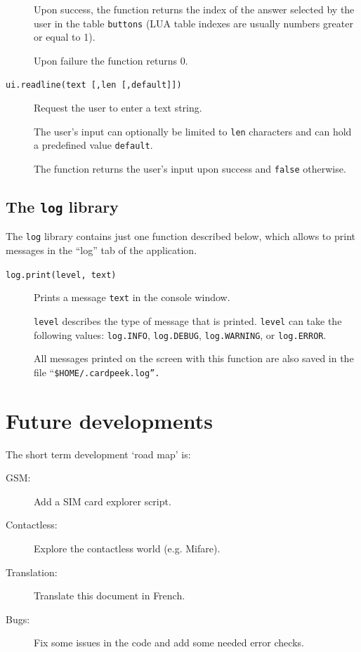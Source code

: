 \documentclass[11pt]{report}
\begin{document}
\begin{description}
{  Upon success, the function returns the index of the answer selected by the 
  user in the table \texttt{buttons} 
  (LUA table indexes are usually numbers greater or equal to 1). 
  
  Upon failure the function returns 0.
}

\item[\texttt{ui.readline(text [,len [,default]])}]
{
  Request the user to enter a text string. 

  The user's input can optionally be limited to \texttt{len} characters and 
  can hold a predefined value \texttt{default}.
  
  The function returns the user's input upon success and \texttt{false} otherwise.
}

\end{description}

\section{The \texttt{log} library}

The \texttt{log} library contains just one function described below, which allows to print messages in the ``log'' tab of the application.

\begin{description}

\item[\texttt{log.print(level, text)}]
{
  Prints a message \texttt{text} in the console window.

  \texttt{level} describes the type of message that is printed. 
  \texttt{level} can take the following values: \texttt{log.INFO}, 
  \texttt{log.DEBUG}, \texttt{log.WARNING}, or \texttt{log.ERROR}.}

  All messages printed on the screen with this function are also 
  saved in the file ``\texttt{\$HOME/.cardpeek.log''.
}

\end{description}

\chapter{Future developments}

The short term development `road map' is:
\begin{description}
\item[GSM:]{Add a SIM card explorer script.}
\item[Contactless:]{Explore the contactless world (e.g. Mifare).}
\item[Translation:]{Translate this document in French.}
\item[Bugs:]{Fix some issues in the code and add some needed error checks.}
\end{description}
\end{document}
